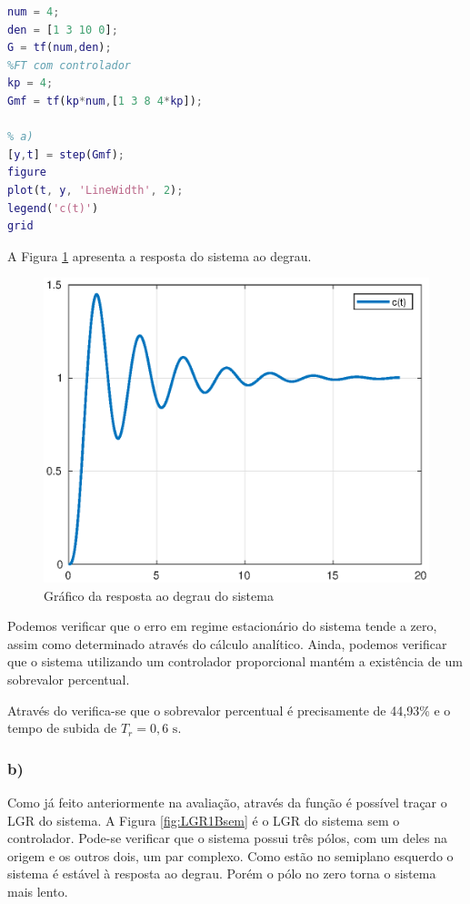     \begin{lstlisting}[language=Matlab,label=Q1A,caption=Análise da estabilidade]
%FT sem controlador
num = 4;
den = [1 3 10 0];
G = tf(num,den);
%FT com controlador
kp = 4;
Gmf = tf(kp*num,[1 3 8 4*kp]);

% a)
[y,t] = step(Gmf);
figure
plot(t, y, 'LineWidth', 2);
legend('c(t)')
grid
    \end{lstlisting}

    A Figura \ref{fig:Q1A} apresenta a resposta do sistema ao degrau.


    \begin{figure}[!ht]
        \centering
        \includegraphics[width = 0.75\linewidth]{Figuras/ProblemasPI/Problema1/step1.eps}
        \caption{Gráfico da resposta ao degrau do sistema}
        \label{fig:Q1A}                   
    \end{figure}

    Podemos verificar que o erro em regime estacionário do sistema tende a zero, assim como determinado 
    através do cálculo analítico. Ainda, podemos verificar que o sistema utilizando um controlador proporcional
    mantém a existência de um sobrevalor percentual.

    Através do  verifica-se que o sobrevalor percentual é precisamente de 44,93\% e o tempo
    de subida de $T_r =0,6 \text{ s} $. 

\subsubsection*{b)}

    Como já feito anteriormente na avaliação, através da função  é possível traçar o LGR 
    do sistema. A Figura \ref{fig:LGR1Bsem} é o LGR do sistema sem o controlador. Pode-se verificar que
    o sistema possui três pólos, com um deles na origem e os outros dois, um par complexo. Como estão 
    no semiplano esquerdo o sistema é estável à resposta ao degrau. Porém o pólo no zero torna o sistema
    mais lento.
    

